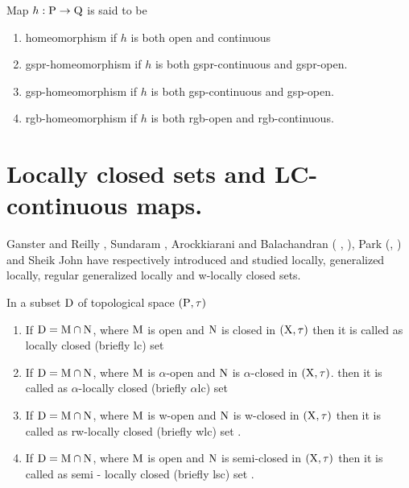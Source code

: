 \begin{dfn}\label{dfn1.4.3}
Map $h: \mathrm{P} \rightarrow \mathrm{Q}$ is said to be 
\begin{enumerate}
\item homeomorphism if $h$ is both open and continuous
\item gspr-homeomorphism if $h$ is both gspr-continuous and gspr-open.
\item gsp-homeomorphism if $h$ is both gsp-continuous and gsp-open.
\item rgb-homeomorphism if $h$ is both rgb-open and rgb-continuous.
\end{enumerate}
\end{dfn}

\section{Locally closed sets and LC-continuous maps.}

Ganster and Reilly \cite{key37}, Sundaram \cite{key89}, Arockkiarani and Balachandran ( \cite{key4}, \cite{key5} ), Park (\cite{key74}, \cite{key76}) and Sheik John \cite{key83} have respectively introduced and studied locally, generalized locally, regular generalized locally and w-locally closed sets. 

\begin{dfn}\label{dfn1.5.1}
In a subset $\mathrm{D}$ of topological space $(\mathrm{P}, \tau)$ 
\begin{enumerate}[\rm (i)]
\item If $\mathrm{D}=\mathrm{M} \cap \mathrm{N}$, where $\mathrm{M}$ is open and $\mathrm{N}$ is closed in $(\mathrm{X},\tau)$ then it is called as locally closed (briefly lc) set \cite{key5} 
\item If $\mathrm{D}=\mathrm{M} \cap \mathrm{N}$, where $\mathrm{M}$ is $\alpha$-open and $\mathrm{N}$ is $\alpha$-closed in $(\mathrm{X}, \tau)$. then it is called as $\alpha$-locally closed (briefly $\alpha$lc) set \cite{key2} 
\item If $\mathrm{D}=\mathrm{M} \cap \mathrm{N}$, where $\mathrm{M}$ is w-open and $\mathrm{N}$ is w-closed in $(\mathrm{X}, \tau)$ then it is called as rw-locally closed (briefly wlc) set \cite{key3} .
\item If $\mathrm{D}=\mathrm{M} \cap \mathrm{N}$, where $\mathrm{M}$ is open and $\mathrm{N}$ is semi-closed in $(\mathrm{X}, \tau)$ then it is called as semi - locally closed (briefly lsc) set \cite{key3} .
\end{enumerate}
\end{dfn}

